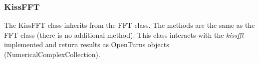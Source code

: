 
\newpage\subsubsection{KissFFT}
The KissFFT class inherits from the FFT class. The methods are the same as the FFT class (there is no additional method).
This class interacts with the \emph{kissfft} implemented and return results as OpenTurns objects (NumericalComplexCollection).

